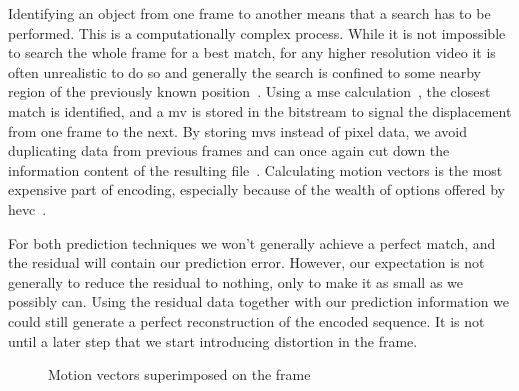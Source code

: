 Identifying an object from one frame to another means that a search has to be performed. This is a computationally complex process. While it is not impossible to search the whole frame for a best match, for any higher resolution video it is often unrealistic to do so and generally the search is confined to some nearby region of the previously known position~\cite{Wien_Coding_Tools}. Using a \gls{mse} calculation~\cite{Flierl}, the closest match is identified, and a \gls{mv} is stored in the bitstream to signal the displacement from one frame to the next. By storing \glspl{mv} instead of pixel data, we avoid duplicating data from previous frames and can once again cut down the information content of the resulting file~\cite{Flierl}. Calculating motion vectors is the most expensive part of encoding, especially because of the wealth of options offered by \gls{hevc}~\cite{Van_Wallendael}.

For both prediction techniques we won't generally achieve a perfect match, and the residual will contain our prediction error. However, our expectation is not generally to reduce the residual to nothing, only to make it as small as we possibly can. Using the residual data together with our prediction information we could still generate a perfect reconstruction of the encoded sequence. It is not until a later step that we start introducing distortion in the frame.

\begin{figure}
    \centering
        {}
    \caption{Motion vectors superimposed on the frame}
    \label{fig:motion_vectors}
\end{figure}

